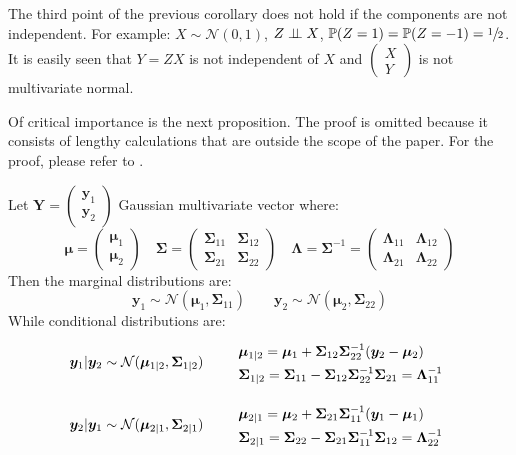\begin{oss}
    The third point of the previous corollary does not hold if the components are not independent. For example: $X\sim \mathcal{N}(0,1)$, $Z\perp \!\!\! \perp X$, $\mathbb{P}(Z=1)=\mathbb{P}(Z=-1)=\sfrac{1}{2}$. It is easily seen that $Y=ZX$ is not independent of $X$ and $\begin{pmatrix}
X\\
Y
\end{pmatrix}$ is not multivariate normal.
\end{oss}

\newpage


Of critical importance is the next proposition. The proof is omitted because it consists of lengthy calculations that are outside the scope of the paper. For the proof, please refer to \cite{murphy_probabilistic_2022}.
\begin{prop} \label{marginale-condizionata}
Let $\bm{Y}=\begin{pmatrix}\bm{y}_1 \\ \bm{y}_2\end{pmatrix}$ Gaussian multivariate vector where:
\[
\bm{\mu}=\begin{pmatrix}\bm{\mu}_1\\ \bm{\mu}_2\end{pmatrix}\quad
 \bm{\Sigma}=\begin{pmatrix}\bm{\Sigma}_{11}&\bm{\Sigma}_{12}\\ \bm{\Sigma}_{21}&\bm{\Sigma}_{22}\end{pmatrix}\quad \bm{\Lambda}=\bm{\Sigma}^{-1}=\begin{pmatrix}\bm{\Lambda}_{11}&\bm{\Lambda}_{12}\\\bm{\Lambda}_{21}&\bm{\Lambda}_{22}\end{pmatrix}
\]
Then the marginal distributions are:
\[
\bm{y}_1\sim \mathcal{N}(\bm{\mu}_1, \bm{\Sigma}_{11}) \qquad \bm{y}_2\sim \mathcal{N}(\bm{\mu}_2, \bm{\Sigma}_{22})
\]
While conditional distributions are:
\[
\bm{y}_1 | \bm{y}_2 \sim \mathcal{N}(\bm{\mu}_{1|2}, \bm{\Sigma}_{1|2}) \qquad
\def\arraystretch{1.4}
\begin{array}{l}
    \bm{\mu}_{1|2}        =\bm{\mu}_1+\bm{\Sigma}_{12}\bm{\Sigma}_{22}^{-1}(\bm{y}_2-\bm{\mu}_2)\\
    \bm{\Sigma}_{1|2}=\bm{\Sigma}_{11}-\bm{\Sigma}_{12}\bm{\Sigma}_{22}^{-1}\bm{\Sigma}_{21}=\bm{\Lambda}_{11}^{-1}
\end{array}
\]

\[
\bm{y}_2 | \bm{y}_1 \sim \mathcal{N}(\bm{\mu}_{2|1}, \bm{\Sigma}_{2|1})
\qquad
\def\arraystretch{1.4}
\begin{array}{l}
    \bm{\mu}_{2|1}        =\bm{\mu}_2+\bm{\Sigma}_{21}\bm{\Sigma}_{11}^{-1}(\bm{y}_1-\bm{\mu}_1)\\
    \bm{\Sigma}_{2|1}=\bm{\Sigma}_{22}-\bm{\Sigma}_{21}\bm{\Sigma}_{11}^{-1}\bm{\Sigma}_{12}=\bm{\Lambda}_{22}^{-1}
\end{array}
\]
\end{prop}


